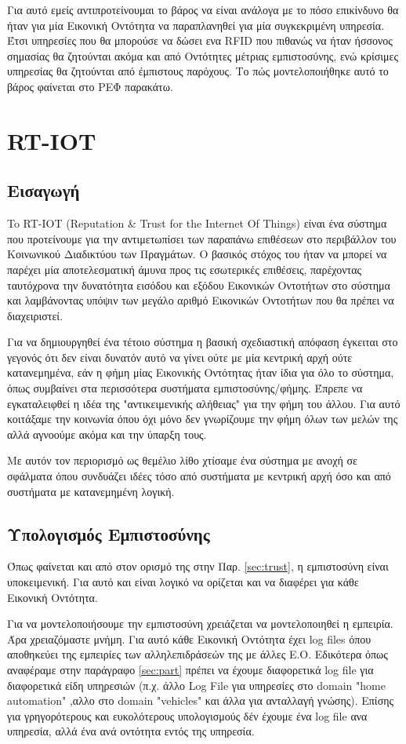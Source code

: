Για αυτό εμείς αντιπροτείνουμαι το βάρος να είναι ανάλογα με το πόσο επικίνδυνο θα ήταν για μία Εικονική Οντότητα να παραπλανηθεί για μία συγκεκριμένη υπηρεσία. Έτσι υπηρεσίες που θα μπορούσε να δώσει ενα RFID  που πιθανώς να ήταν ήσσονος σημασίας θα ζητούνται ακόμα και από Οντότητες μέτριας εμπιστοσύνης, ενώ κρίσιμες υπηρεσίας θα ζητούνται από έμπιστους παρόχους. Το πώς μοντελοποιήθηκε αυτό το βάρος φαίνεται στο ΡΕΦ παρακάτω.
\newpage

\section{RT-IOT}
\subsection{Εισαγωγή}
To RT-IOT (Reputation \& Trust for the Internet Of Things) είναι ένα σύστημα που προτείνουμε για την αντιμετωπίσει των παραπάνω επιθέσεων στο περιβάλλον του Κοινωνικού Διαδικτύου των Πραγμάτων. Ο βασικός στόχος του ήταν να μπορεί να παρέχει μία αποτελεσματική άμυνα προς τις εσωτερικές επιθέσεις, παρέχοντας ταυτόχρονα την δυνατότητα εισόδου και εξόδου Εικονικών Οντοτήτων στο σύστημα 
και λαμβάνοντας υπόψιν των μεγάλο αριθμό Εικονικών Οντοτήτων που θα πρέπει να διαχειριστεί.

Για να δημιουργηθεί ένα τέτοιο σύστημα η βασική σχεδιαστική απόφαση έγκειται στο γεγονός ότι δεν είναι δυνατόν αυτό να γίνει ούτε με μία κεντρική αρχή ούτε κατανεμημένα, εάν η φήμη μίας Εικονικής Οντότητας ήταν ίδια για όλο το σύστημα, όπως συμβαίνει στα περισσότερα συστήματα εμπιστοσύνης/φήμης. Έπρεπε να εγκαταλειφθεί η ιδέα της "αντικειμενικής αλήθειας" για την φήμη του άλλου. Για αυτό κοιτάξαμε την κοινωνία όπου όχι μόνο δεν γνωρίζουμε την φήμη όλων των μελών της αλλά αγνοούμε ακόμα και την ύπαρξη τους.

Με αυτόν τον περιορισμό ως θεμέλιο λίθο χτίσαμε ένα σύστημα με ανοχή σε σφάλματα όπου συνδυάζει ιδέες τόσο από συστήματα με κεντρική αρχή όσο και από συστήματα με κατανεμημένη λογική.

\subsection{Υπολογισμός Εμπιστοσύνης}\label{sec:calculate_trust}
Όπως φαίνεται και από στον ορισμό της στην Παρ. \ref{sec:trust}, η εμπιστοσύνη είναι υποκειμενική. Για αυτό και είναι λογικό να ορίζεται και να διαφέρει για κάθε Εικονική Οντότητα.

Για να μοντελοποιήσουμε την εμπιστοσύνη χρειάζεται να μοντελοποιηθεί η εμπειρία. Άρα χρειαζόμαστε μνήμη. Για αυτό κάθε Εικονική Οντότητα έχει log files όπου αποθηκεύει της εμπειρίες των αλληλεπιδράσεών της με άλλες Ε.Ο. Εδικότερα όπως αναφέραμε στην παράγραφο \ref{sec:part} πρέπει να έχουμε διαφορετικά log file για διαφορετικά είδη υπηρεσιών (π.χ. άλλο Log File για υπηρεσίες στο domain "home automation" ,αλλο  στο domain "vehicles" και άλλα για ανταλλαγή γνώσης). Επίσης για γρηγορότερους και ευκολότερους υπολογισμούς δέν έχουμε ένα log file ανα υπηρεσία, αλλά ένα ανά οντότητα εντός της υπηρεσία.


